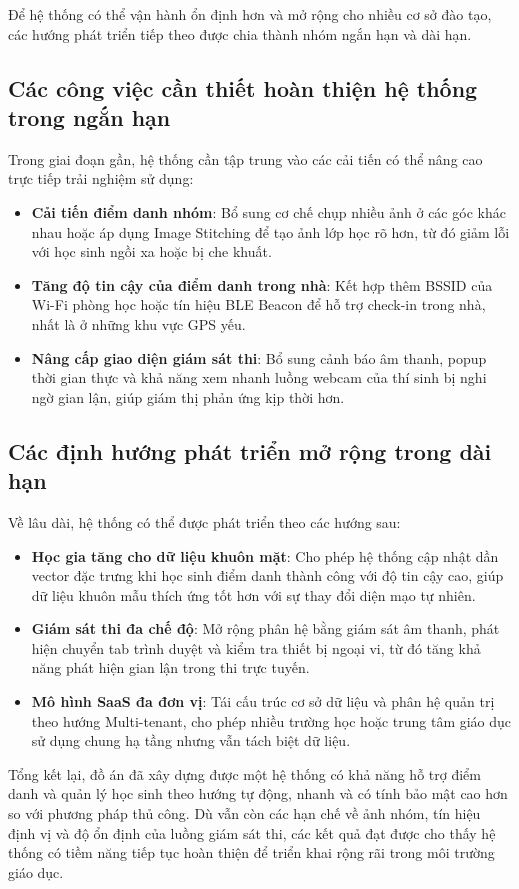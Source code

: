 \documentclass[../DoAn.tex]{subfiles}
\begin{document}
Để hệ thống có thể vận hành ổn định hơn và mở rộng cho nhiều cơ sở đào tạo, các hướng phát triển tiếp theo được chia thành nhóm ngắn hạn và dài hạn.

\subsection{Các công việc cần thiết hoàn thiện hệ thống trong ngắn hạn}
Trong giai đoạn gần, hệ thống cần tập trung vào các cải tiến có thể nâng cao trực tiếp trải nghiệm sử dụng:
\begin{itemize}
    \item \textbf{Cải tiến điểm danh nhóm}: Bổ sung cơ chế chụp nhiều ảnh ở các góc khác nhau hoặc áp dụng Image Stitching để tạo ảnh lớp học rõ hơn, từ đó giảm lỗi với học sinh ngồi xa hoặc bị che khuất.
    \item \textbf{Tăng độ tin cậy của điểm danh trong nhà}: Kết hợp thêm BSSID của Wi-Fi phòng học hoặc tín hiệu BLE Beacon để hỗ trợ check-in trong nhà, nhất là ở những khu vực GPS yếu.
    \item \textbf{Nâng cấp giao diện giám sát thi}: Bổ sung cảnh báo âm thanh, popup thời gian thực và khả năng xem nhanh luồng webcam của thí sinh bị nghi ngờ gian lận, giúp giám thị phản ứng kịp thời hơn.
\end{itemize}

\subsection{Các định hướng phát triển mở rộng trong dài hạn}
Về lâu dài, hệ thống có thể được phát triển theo các hướng sau:
\begin{itemize}
    \item \textbf{Học gia tăng cho dữ liệu khuôn mặt}: Cho phép hệ thống cập nhật dần vector đặc trưng khi học sinh điểm danh thành công với độ tin cậy cao, giúp dữ liệu khuôn mẫu thích ứng tốt hơn với sự thay đổi diện mạo tự nhiên.
    \item \textbf{Giám sát thi đa chế độ}: Mở rộng phân hệ  bằng giám sát âm thanh, phát hiện chuyển tab trình duyệt và kiểm tra thiết bị ngoại vi, từ đó tăng khả năng phát hiện gian lận trong thi trực tuyến.
    \item \textbf{Mô hình SaaS đa đơn vị}: Tái cấu trúc cơ sở dữ liệu và phân hệ quản trị theo hướng Multi-tenant, cho phép nhiều trường học hoặc trung tâm giáo dục sử dụng chung hạ tầng nhưng vẫn tách biệt dữ liệu.
\end{itemize}

Tổng kết lại, đồ án đã xây dựng được một hệ thống có khả năng hỗ trợ điểm danh và quản lý học sinh theo hướng tự động, nhanh và có tính bảo mật cao hơn so với phương pháp thủ công. Dù vẫn còn các hạn chế về ảnh nhóm, tín hiệu định vị và độ ổn định của luồng giám sát thi, các kết quả đạt được cho thấy hệ thống có tiềm năng tiếp tục hoàn thiện để triển khai rộng rãi trong môi trường giáo dục.
\end{document}
